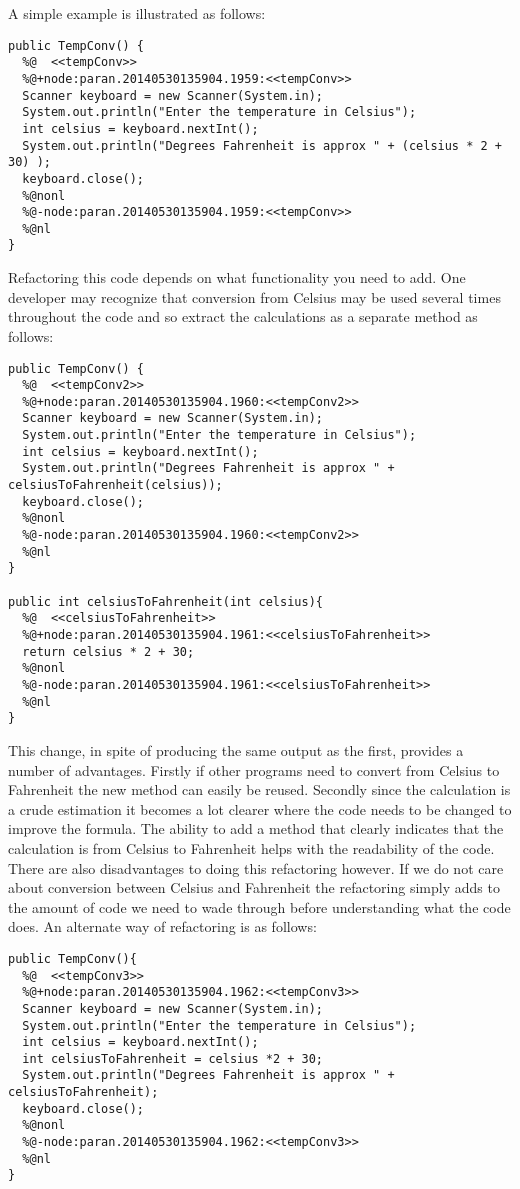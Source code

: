 A simple example is illustrated as follows:

\begin{lstlisting}
public TempConv() {
  %@  <<tempConv>>
  %@+node:paran.20140530135904.1959:<<tempConv>>
  Scanner keyboard = new Scanner(System.in);
  System.out.println("Enter the temperature in Celsius");
  int celsius = keyboard.nextInt();
  System.out.println("Degrees Fahrenheit is approx " + (celsius * 2 + 30) );
  keyboard.close();
  %@nonl
  %@-node:paran.20140530135904.1959:<<tempConv>>
  %@nl
}
\end{lstlisting}

Refactoring this code depends on what functionality you need to add. One developer may recognize that conversion from Celsius may be used several times throughout the code and so extract the calculations as a separate method as follows:

\begin{lstlisting}
public TempConv() {
  %@  <<tempConv2>>
  %@+node:paran.20140530135904.1960:<<tempConv2>>
  Scanner keyboard = new Scanner(System.in);
  System.out.println("Enter the temperature in Celsius");
  int celsius = keyboard.nextInt();
  System.out.println("Degrees Fahrenheit is approx " + celsiusToFahrenheit(celsius));
  keyboard.close();
  %@nonl
  %@-node:paran.20140530135904.1960:<<tempConv2>>
  %@nl
}

public int celsiusToFahrenheit(int celsius){
  %@  <<celsiusToFahrenheit>>
  %@+node:paran.20140530135904.1961:<<celsiusToFahrenheit>>
  return celsius * 2 + 30;
  %@nonl
  %@-node:paran.20140530135904.1961:<<celsiusToFahrenheit>>
  %@nl
}
\end{lstlisting}

This change, in spite of producing the same output as the first, provides a number of advantages. Firstly if other programs need to convert from Celsius to Fahrenheit the new method can easily be reused. Secondly since the calculation is a crude estimation it becomes a lot clearer where the code needs to be changed to improve the formula. The ability to add a method that clearly indicates that the calculation is from Celsius to Fahrenheit helps with the readability of the code. There are also disadvantages to doing this refactoring however. If we do not care about conversion between Celsius and Fahrenheit the refactoring simply adds to the amount of code we need to wade through before understanding what the code does. An alternate way of refactoring is as follows:

\begin{lstlisting}
public TempConv(){
  %@  <<tempConv3>>
  %@+node:paran.20140530135904.1962:<<tempConv3>>
  Scanner keyboard = new Scanner(System.in);
  System.out.println("Enter the temperature in Celsius");
  int celsius = keyboard.nextInt();
  int celsiusToFahrenheit = celsius *2 + 30;
  System.out.println("Degrees Fahrenheit is approx " + celsiusToFahrenheit);
  keyboard.close();
  %@nonl
  %@-node:paran.20140530135904.1962:<<tempConv3>>
  %@nl
}
\end{lstlisting}

